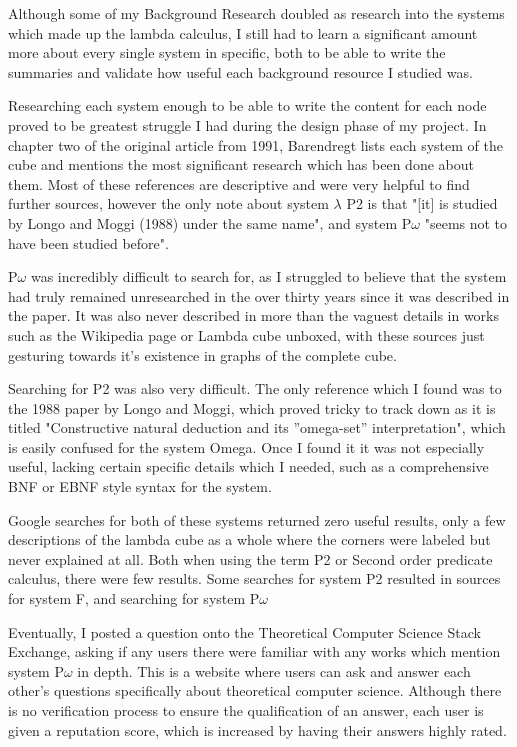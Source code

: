 \documentclass{l4proj}
\begin{document}
Although some of my Background Research doubled as research into the systems which made up the lambda calculus, I still had to learn a significant amount more about every single system in specific, both to be able to write the summaries and validate how useful each background resource I studied was.

Researching each system enough to be able to write the content for each node proved to be greatest struggle I had during the design phase of my project.  In chapter two of the original article from 1991, Barendregt lists each system of the cube and mentions the most significant research which has been done about them.  Most of these references are descriptive and were very helpful to find further sources, however the only note about system $\lambda$ P2 is that "[it] is studied by Longo and Moggi (1988) under the same name", and system P\underline{$\omega$} "seems not to have been studied before".

P\underline{$\omega$} was incredibly difficult to search for, as I struggled to believe that the system had truly remained unresearched in the over thirty years since it was described in the paper.  It was also never described in more than the vaguest details in works such as the Wikipedia page or Lambda cube unboxed, with these sources just gesturing towards it's existence in graphs of the complete cube.  

Searching for P2 was also very difficult.  The only reference which I found was to the 1988 paper by Longo and Moggi, which proved tricky to track down as it is titled "Constructive natural deduction and its ”omega-set” interpretation", which is easily confused for the system Omega.  Once I found it it was not especially useful, lacking certain specific details which I needed, such as a comprehensive BNF or EBNF style syntax for the system.

Google searches for both of these systems returned zero useful results, only a few descriptions of the lambda cube as a whole where the corners were labeled but never explained at all.  Both when using the term P2 or Second order predicate calculus, there were few results.  Some searches for system P2 resulted in sources for system F, and searching for system P\underline{$\omega$}

Eventually, I posted a question onto the Theoretical Computer Science Stack Exchange, asking if any users there were familiar with any works which mention system P\underline{$\omega$} in depth. This is a website where users can ask and answer each other's questions specifically about theoretical computer science.  Although there is no verification process to ensure the qualification of an answer, each user is given a reputation score, which is increased by having their answers highly rated.  
\end{document}
